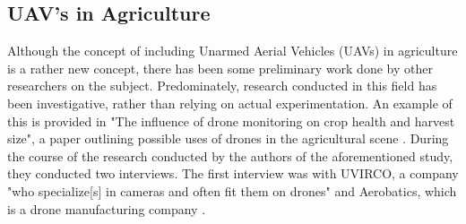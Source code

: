 \subsection{UAV's in Agriculture}
Although the concept of including Unarmed Aerial Vehicles (UAVs) in agriculture is a rather new concept, there has been some preliminary work done by other researchers on the subject.
Predominately, research conducted in this field has been investigative, rather than relying on actual experimentation.
An example of this is provided in "The influence of drone monitoring on crop health and harvest size", a paper outlining possible uses of drones in the agricultural scene \cite{Reinecke2017}.
During the course of the research conducted by the authors of the aforementioned study, they conducted two interviews. The first interview was with UVIRCO, a company "who specialize[s] in cameras and often fit them on drones" and Aerobatics, which is a drone manufacturing company \cite{Reinecke2017}. 